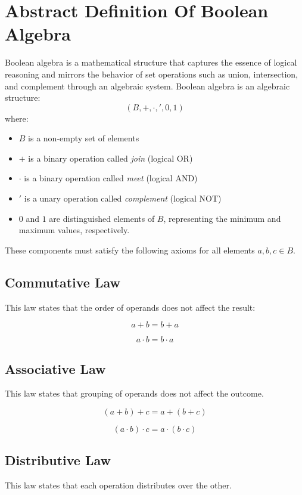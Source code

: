\section{Abstract Definition Of Boolean Algebra}

Boolean algebra is a mathematical structure that captures the essence of logical reasoning and mirrors the behavior of set operations such as union, intersection, and complement through an algebraic system. Boolean algebra is an algebraic structure:
\[
(B, +, \cdot, ', 0, 1)
\]
where:
\begin{itemize}
\item $B$ is a non-empty set of elements
\item $+$ is a binary operation called \textit{join} (logical OR)
\item $\cdot$ is a binary operation called \textit{meet} (logical AND)
\item $'$ is a unary operation called \textit{complement} (logical NOT)
\item $0$ and $1$ are distinguished elements of $B$, representing the minimum and maximum values, respectively.
\end{itemize}

These components must satisfy the following axioms for all elements $a,b,c \in B$.

\subsection{ Commutative Law}

This law states that the order of operands does not affect the result:

\[
a + b = b + a
\]

\[
a \cdot b = b \cdot a
\]

\subsection{ Associative Law}

This law states that grouping of operands does not affect the outcome.

\[
(a + b) + c = a + (b + c)
\]

\[
(a \cdot b) \cdot c = a \cdot (b \cdot c)
\]

\subsection{ Distributive Law}

This law states that each operation distributes over the other.

